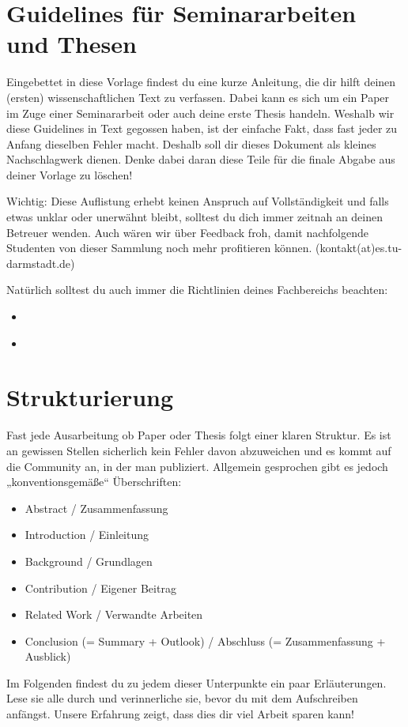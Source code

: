 \section*{Guidelines für Seminararbeiten und Thesen}

Eingebettet in diese Vorlage findest du eine kurze Anleitung, die dir hilft deinen (ersten) wissenschaftlichen Text zu verfassen.
Dabei kann es sich um ein Paper im Zuge einer Seminararbeit oder auch deine erste Thesis handeln.
Weshalb wir diese Guidelines in Text gegossen haben, ist der einfache Fakt, dass fast jeder zu Anfang dieselben Fehler macht.
Deshalb soll dir dieses Dokument als kleines Nachschlagwerk dienen.
Denke dabei daran diese Teile für die finale Abgabe aus deiner Vorlage zu löschen!

Wichtig: Diese Auflistung erhebt keinen Anspruch auf Vollständigkeit und falls etwas unklar oder unerwähnt bleibt, solltest du dich immer zeitnah an deinen Betreuer wenden.
Auch wären wir über Feedback froh, damit nachfolgende Studenten von dieser Sammlung noch mehr profitieren können. (kontakt(at)es.tu-darmstadt.de) 

Natürlich solltest du auch immer die Richtlinien deines Fachbereichs beachten:
\begin{itemize}
	\item \href{https://www.etit.tu-darmstadt.de/media/etit/studium_1/dokumente_4/richtlinien/richtlinienabschlussarbeiten.pdf}{\color{blue}{Fachbereich Elektrotechnik und Informationstechnik}}
	\item \href{https://www.informatik.tu-darmstadt.de/studium_fb20/im_studium/studienbuero/abschlussarbeiten_fb20/index.de.jsp}{\color{blue}{Fachbereich Informatik}}
\end{itemize}

\section*{Strukturierung}
Fast jede Ausarbeitung ob Paper oder Thesis folgt einer klaren Struktur. 
Es ist an gewissen Stellen sicherlich kein Fehler davon abzuweichen und es kommt auf die Community an, in der man publiziert. 
Allgemein gesprochen gibt es jedoch „konventionsgemäße“ Überschriften:
\begin{itemize}
	\item Abstract / Zusammenfassung
	\item Introduction / Einleitung
	\item Background / Grundlagen
	\item Contribution / Eigener Beitrag
	\item Related Work / Verwandte Arbeiten
	\item Conclusion (= Summary + Outlook) / Abschluss (= Zusammenfassung + Ausblick)
\end{itemize}

Im Folgenden findest du zu jedem dieser Unterpunkte ein paar Erläuterungen.
Lese sie alle durch und verinnerliche sie, bevor du mit dem Aufschreiben anfängst.
Unsere Erfahrung zeigt, dass dies dir viel Arbeit sparen kann!